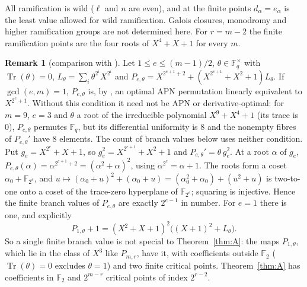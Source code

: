 \documentclass[preprint,12pt]{elsarticle}
\theoremstyle{definition}
\newtheorem{remark}[theorem]{Remark}
\newcommand{\F}{\mathbb{F}}
\newcommand{\Tr}{\operatorname{Tr}}
\begin{document}
All ramification is wild ($\ell$ and $n$ are even), and at the finite points $d_\alpha=e_\alpha$ is the least value allowed for wild ramification. Galois closures, monodromy and higher ramification groups are not determined here. For $r=m-2$ the finite ramification points are the four roots of $X^4+X+1$ for every $m$.

\begin{remark}[comparison with \cite{TIT}]\label{rem:tit}
Let $1\le e\le(m-1)/2$, $\theta\in\F_q^\times$ with $\Tr(\theta)=0$, $L_\theta=\sum_i\theta^{2^i}X^{2^i}$ and $P_{e,\theta}=X^{2^{e+1}+2}+(X^{2^{e+1}}+X^2+1)L_\theta$. If $\gcd(e,m)=1$, $P_{e,\theta}$ is, by \cite[App.~A]{TIT}, an optimal APN permutation linearly equivalent to $X^{2^e+1}$. Without this condition it need not be APN or derivative-optimal: for $m=9$, $e=3$ and $\theta$ a root of the irreducible polynomial $X^9+X^4+1$ (its trace is $0$), $P_{e,\theta}$ permutes $\F_q$, but its differential uniformity is $8$ and the nonempty fibres of $P_{e,\theta}'$ have $8$ elements. The count of branch values below uses neither condition. Put $g_e=X^{2^e}+X+1$, so $g_e^2=X^{2^{e+1}}+X^2+1$ and $P_{e,\theta}'=\theta\,g_e^2$. At a root $\alpha$ of $g_e$, $P_{e,\theta}(\alpha)=\alpha^{2^{e+1}+2}=(\alpha^2+\alpha)^2$, using $\alpha^{2^e}=\alpha+1$. The roots form a coset $\alpha_0+\F_{2^e}$, and $u\mapsto(\alpha_0+u)^2+(\alpha_0+u)=(\alpha_0^2+\alpha_0)+(u^2+u)$ is two-to-one onto a coset of the trace-zero hyperplane of $\F_{2^e}$; squaring is injective. Hence the finite branch values of $P_{e,\theta}$ are exactly $2^{e-1}$ in number. For $e=1$ there is one, and explicitly
\[
P_{1,\theta}+1=(X^2+X+1)^2\bigl((X+1)^2+L_\theta\bigr).
\]
So a single finite branch value is not special to Theorem~\ref{thm:A}: the maps $P_{1,\theta}$, which lie in the class of $X^3$ like $P_{m,r}$, have it, with coefficients outside $\F_2$ ($\Tr(\theta)=0$ excludes $\theta=1$) and two finite critical points. Theorem~\ref{thm:A} has coefficients in $\F_2$ and $2^{m-r}$ critical points of index $2^{r-2}$.
\end{remark}
\end{document}
